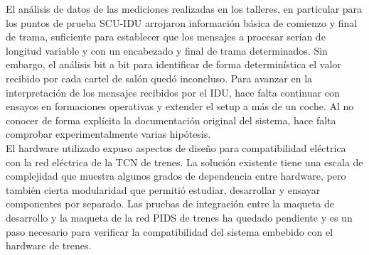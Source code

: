 El análisis de datos de las mediciones realizadas en los talleres, en particular para los puntos de prueba SCU-IDU arrojaron información básica de comienzo y final de trama, suficiente para establecer que los mensajes a procesar serían de longitud variable y con un encabezado y final de trama determinados. Sin embargo, el análisis bit a bit para identificar de forma determinística el valor recibido por cada cartel de salón quedó inconcluso. Para avanzar en la interpretación de los mensajes recibidos por el IDU, hace falta continuar con ensayos en formaciones operativas y extender el setup a más de un coche. Al no conocer de forma explícita la documentación original del sistema, hace falta comprobar experimentalmente varias hipótesis.\\

El hardware utilizado expuso aspectos de diseño para compatibilidad eléctrica con la red eléctrica de la TCN de trenes. La solución existente tiene una escala de complejidad que muestra algunos grados de dependencia entre hardware, pero también cierta modularidad que permitió estudiar, desarrollar y ensayar componentes por separado. Las pruebas de integración entre la maqueta de desarrollo y la maqueta de la red PIDS de trenes ha quedado pendiente y es un paso necesario para verificar la compatibilidad del sistema embebido con el hardware de trenes.\\
